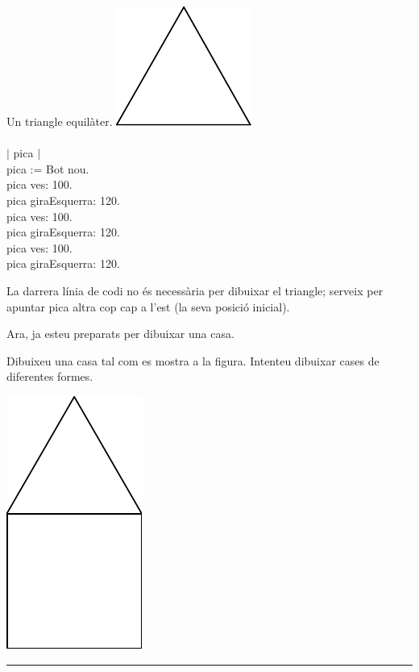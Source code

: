 \begin{script}  Un triangle equilàter.
\newline
\newline
\noindent
\includegraphics[scale=0.8]{Imatges/figuraS4-7.pdf} 
\noindent
\textsf{\upshape
\\
\\$|$ pica $|$\\
pica := Bot nou.\\
pica ves: 100.\\
pica giraEsquerra: 120.\\
pica ves: 100.\\
pica giraEsquerra: 120.\\
pica ves: 100.\\
pica giraEsquerra: 120.\\
}
\label{scr4-7}
\end{script}

\noindent
La darrera línia de codi no és necessària per dibuixar el triangle; serveix per apuntar \textsf{pica} altra cop cap a l'est (la seva posició inicial).

\vspace*{2mm}

\noindent
Ara, ja esteu preparats per dibuixar una casa.

\begin{center}
\colorbox{black}{}
\end{center}
{\small
\noindent
Dibuixeu una casa tal com es mostra a la figura. Intenteu dibuixar cases de diferentes formes.}
\begin{center}
\includegraphics[scale=0.75]{Imatges/figuraE4-8.pdf} 
\end{center}
\noindent
\rule{\textwidth}{3pt}

